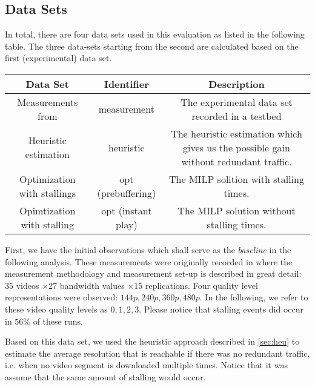
\subsection{Data Sets}

In total, there are four data sets used in this evaluation as listed in the following table. The three data-sets starting from the second are calculated based on the first (experimental) data set.

\begin{tabular}{|c|c|c|}
\hline 
Data Set & Identifier & Description \\ 
\hline 
Measurements from \cite{sieber16sacrificing} & measurement & The experimental data set recorded in a testbed \\ 
\hline 
Heuristic estimation & heuristic & The heuristic estimation which gives us the possible gain without redundant traffic. \\ 
\hline 
Optimization with stallings & opt (prebuffering) & The MILP solition with stalling times. \\ 
\hline 
Opimtization with stalling & opt (instant play) & The MILP solution without stalling times. \\ 
\hline 
\end{tabular} 


First, we have the initial observations which shall serve as the \textit{baseline} in the following analysis. These measurements were originally recorded in \cite{sieber16sacrificing} where the measurement methodology and measurement set-up is described in great detail: $35$ videos $\times 27$ bandwidth values $\times 15$ replications. Four quality level representations were observed: $144p, 240p, 360p, 480p$. In the following, we refer to these video quality levels as $0,1,2,3$. Please notice that stalling events did occur in $56\%$ of these runs.

Based on this data set, we used the heuristic approach described in \ref{sec:heu} to estimate the average resolution that is reachable if there was no redundant traffic, i.e. when no video segment is downloaded multiple times. Notice that it was assume that the same amount of stalling would occur.

